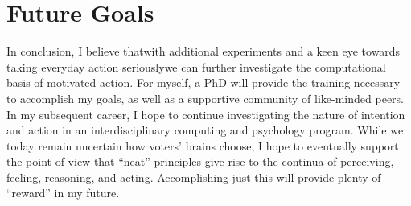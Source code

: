 \section*{Future Goals}

\begin{singlespace}
\im
In conclusion, I believe that\textemdash with additional experiments
and a keen eye towards taking everyday action seriously\textemdash we
can further investigate the computational basis of motivated action.
For myself, a PhD will provide the training necessary to accomplish
my goals, as well as a supportive community of like-minded peers.
In my subsequent career, I hope to continue investigating the nature
of intention and action in an interdisciplinary computing and psychology
program. While we today remain uncertain how voters\textquoteright{}
brains choose, I hope to eventually support the point of view that
``neat'' principles give rise to the continua of perceiving, feeling,
reasoning, and acting. Accomplishing just this will provide plenty
of ``reward'' in my future.
\end{singlespace}

